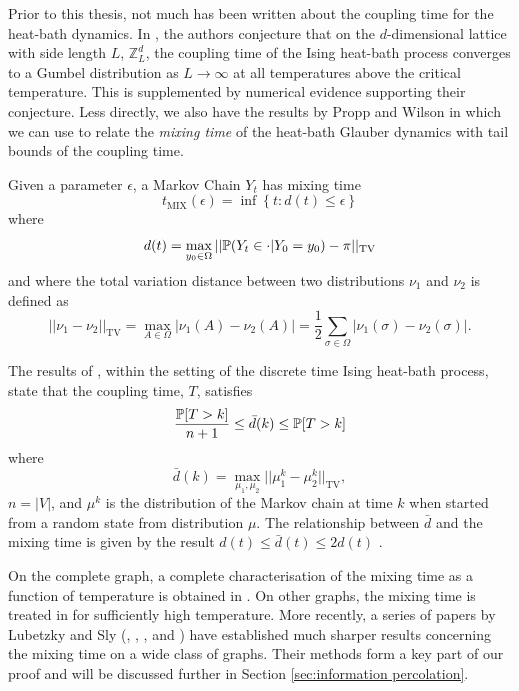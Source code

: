 	Prior to this thesis, not much has been written about the coupling time for the heat-bath dynamics. In \cite[Conjecture 7.1]{Collevecchio2018-nq}, the authors conjecture that on the $d$-dimensional lattice with side length $L$, $\mathbb{Z}^d_L$, the coupling time of the Ising heat-bath process converges to a Gumbel distribution as $L \rightarrow \infty$ at all temperatures above the critical temperature. This is supplemented by numerical evidence supporting their conjecture. Less directly, we also have the results by Propp and Wilson in \cite[Section 5]{Propp1996-cf} which we can use to relate the \emph{mixing time} of the heat-bath Glauber dynamics with tail bounds of the coupling time. 

	Given a parameter $\epsilon$, a Markov Chain $Y_t$ has mixing time
	\begin{equation}
	\label{eq:mixing time definition}
		t_\mathrm{MIX}(\epsilon) = \inf\left\{t: d(t) \leq \epsilon \right\}
	\end{equation}
	where
	\begin{equation}
		d(t) = \max_{y_0 \in \Omega} ||\mathbb{P}(Y_t \in \cdot | Y_0 = y_0) - \pi ||_\mathrm{TV}
	\end{equation}
	and where the total variation distance between two distributions $\nu_1$ and $\nu_2$ is defined as 
	\begin{equation}
		||\nu_1 - \nu_2||_\mathrm{TV} = \max_{A \in \Omega}|\nu_1(A) - \nu_2(A)| = \frac{1}{2}\sum_{\sigma \in \Omega} |\nu_1(\sigma) - \nu_2(\sigma)|.
	\end{equation}

	The results of \cite[Theorem 5]{Propp1996-cf}, within the setting of the discrete time Ising heat-bath process, state that the coupling time, $T$, satisfies
	\begin{equation}
		\frac{\mathbb{P}[T > k]}{n+1} \leq \bar{d}(k) \leq \mathbb{P}[T > k]
	\end{equation}
	where
	\begin{equation}
		\bar{d}(k) = \max_{\mu_1, \mu_2} || \mu_1^k - \mu_2^k||_\mathrm{TV},
	\end{equation}
	$n = |V|$, and $\mu^k$ is the distribution of the Markov chain at time $k$ when started from a random state from distribution $\mu$. The relationship between $\bar{d}$ and the mixing time is given by the result $d(t) \leq \bar{d}(t) \leq 2d(t)$ \cite[Lemma 4.10]{Levin2009-fo}.
	
	On the complete graph, a complete characterisation of the mixing time as a function of temperature is obtained in \cite{Ding2009-du}. On other graphs, the mixing time is treated in \cite{Martinelli1994-bv} for sufficiently high temperature. More recently, a series of papers by Lubetzky and Sly (\cite{Lubetzky2013-yv}, \cite{Lubetzky2015-po}, \cite{Lubetzky2016-wd}, and \cite{Lubetzky2017-nc}) have established much sharper results concerning the mixing time on a wide class of graphs. Their methods form a key part of our proof and will be discussed further in Section \ref{sec:information percolation}.

